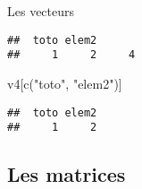 \documentclass[10pt,xcolor=table,color={dvipsnames,usenames},ignorenonframetext,usepdftitle=false,french]{beamer}
\newenvironment{Shaded}{\begin{snugshade}}{\end{snugshade}}
\newcommand{\FunctionTok}[1]{\textcolor[rgb]{0.00,0.00,0.00}{#1}}
\newcommand{\NormalTok}[1]{#1}
\newcommand{\StringTok}[1]{\textcolor[rgb]{0.31,0.60,0.02}{#1}}
\begin{document}
\begin{frame}{Les vecteurs}
\begin{verbatim}
##  toto elem2       
##     1     2     4
\end{verbatim}

\begin{Shaded}
\begin{Highlighting}[]
\NormalTok{v4[}\FunctionTok{c}\NormalTok{(}\StringTok{"toto"}\NormalTok{, }\StringTok{"elem2"}\NormalTok{)]}
\end{Highlighting}
\end{Shaded}

\begin{verbatim}
##  toto elem2 
##     1     2
\end{verbatim}
\end{frame}

\hypertarget{les-matrices}{%
\subsection{Les matrices}\label{les-matrices}}
\end{document}
